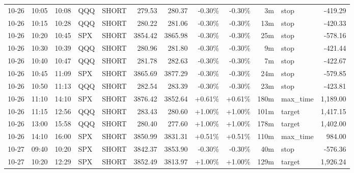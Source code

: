 \documentclass[11pt,a4paper,twoside]{article}
\begin{document}
\begin{center}
\begin{longtable}{>{\color{txtmain}}l l l l l r r r r r >{\color{txtmain}}l r}
10-26 & 10:05 & 10:08 & QQQ & SHORT & 279.53 & 280.37 & \textcolor{lossred}{-0.30\%} & \textcolor{lossred}{-0.30\%} & 3m & stop & \textcolor{lossred}{-419.29} \\
10-26 & 10:15 & 10:28 & QQQ & SHORT & 280.22 & 281.06 & \textcolor{lossred}{-0.30\%} & \textcolor{lossred}{-0.30\%} & 13m & stop & \textcolor{lossred}{-420.33} \\
10-26 & 10:20 & 10:45 & SPX & SHORT & 3854.42 & 3865.98 & \textcolor{lossred}{-0.30\%} & \textcolor{lossred}{-0.30\%} & 25m & stop & \textcolor{lossred}{-578.16} \\
10-26 & 10:30 & 10:39 & QQQ & SHORT & 280.96 & 281.80 & \textcolor{lossred}{-0.30\%} & \textcolor{lossred}{-0.30\%} & 9m & stop & \textcolor{lossred}{-421.44} \\
10-26 & 10:40 & 10:47 & QQQ & SHORT & 281.78 & 282.63 & \textcolor{lossred}{-0.30\%} & \textcolor{lossred}{-0.30\%} & 7m & stop & \textcolor{lossred}{-422.67} \\
10-26 & 10:45 & 11:09 & SPX & SHORT & 3865.69 & 3877.29 & \textcolor{lossred}{-0.30\%} & \textcolor{lossred}{-0.30\%} & 24m & stop & \textcolor{lossred}{-579.85} \\
10-26 & 10:50 & 11:13 & QQQ & SHORT & 282.54 & 283.39 & \textcolor{lossred}{-0.30\%} & \textcolor{lossred}{-0.30\%} & 23m & stop & \textcolor{lossred}{-423.81} \\
10-26 & 11:10 & 14:10 & SPX & SHORT & 3876.42 & 3852.64 & \textcolor{wingreen}{+0.61\%} & \textcolor{wingreen}{+0.61\%} & 180m & max\_time & \textcolor{wingreen}{1,189.00} \\
10-26 & 11:15 & 12:56 & QQQ & SHORT & 283.43 & 280.60 & \textcolor{wingreen}{+1.00\%} & \textcolor{wingreen}{+1.00\%} & 101m & target & \textcolor{wingreen}{1,417.15} \\
10-26 & 13:00 & 15:58 & QQQ & SHORT & 280.40 & 277.60 & \textcolor{wingreen}{+1.00\%} & \textcolor{wingreen}{+1.00\%} & 178m & target & \textcolor{wingreen}{1,402.00} \\
10-26 & 14:10 & 16:00 & SPX & SHORT & 3850.99 & 3831.31 & \textcolor{wingreen}{+0.51\%} & \textcolor{wingreen}{+0.51\%} & 110m & max\_time & \textcolor{wingreen}{984.00} \\
10-27 & 09:40 & 10:20 & SPX & SHORT & 3842.37 & 3853.90 & \textcolor{lossred}{-0.30\%} & \textcolor{lossred}{-0.30\%} & 40m & stop & \textcolor{lossred}{-576.36} \\
10-27 & 10:20 & 12:29 & SPX & SHORT & 3852.49 & 3813.97 & \textcolor{wingreen}{+1.00\%} & \textcolor{wingreen}{+1.00\%} & 129m & target & \textcolor{wingreen}{1,926.24} \\

\end{longtable}
\end{center}
\end{document}
